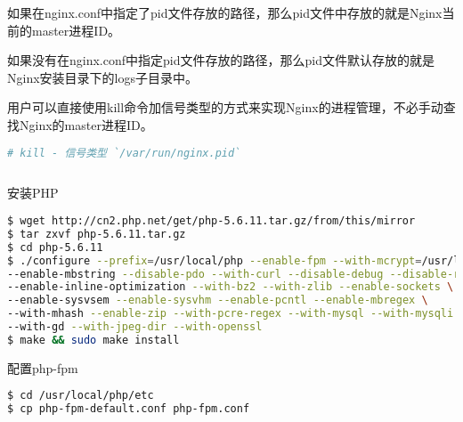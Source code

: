 \begin{compactitem}
\item 如果在nginx.conf中指定了pid文件存放的路径，那么pid文件中存放的就是Nginx当前的master进程ID。

\item 如果没有在nginx.conf中指定pid文件存放的路径，那么pid文件默认存放的就是Nginx安装目录下的logs子目录中。
\end{compactitem}

用户可以直接使用kill命令加信号类型的方式来实现Nginx的进程管理，不必手动查找Nginx的master进程ID。

\begin{lstlisting}[language=bash]
# kill - 信号类型 `/var/run/nginx.pid`
\end{lstlisting}










\begin{lstlisting}[language=bash]

\end{lstlisting}

















安装PHP


\begin{lstlisting}[language=bash]
$ wget http://cn2.php.net/get/php-5.6.11.tar.gz/from/this/mirror
$ tar zxvf php-5.6.11.tar.gz
$ cd php-5.6.11
$ ./configure --prefix=/usr/local/php --enable-fpm --with-mcrypt=/usr/local/libmcrypt \
--enable-mbstring --disable-pdo --with-curl --disable-debug --disable-rpath \
--enable-inline-optimization --with-bz2 --with-zlib --enable-sockets \
--enable-sysvsem --enable-sysvhm --enable-pcntl --enable-mbregex \
--with-mhash --enable-zip --with-pcre-regex --with-mysql --with-mysqli \
--with-gd --with-jpeg-dir --with-openssl
$ make && sudo make install
\end{lstlisting}

配置php-fpm


\begin{lstlisting}[language=bash]
$ cd /usr/local/php/etc
$ cp php-fpm-default.conf php-fpm.conf
\end{lstlisting}

